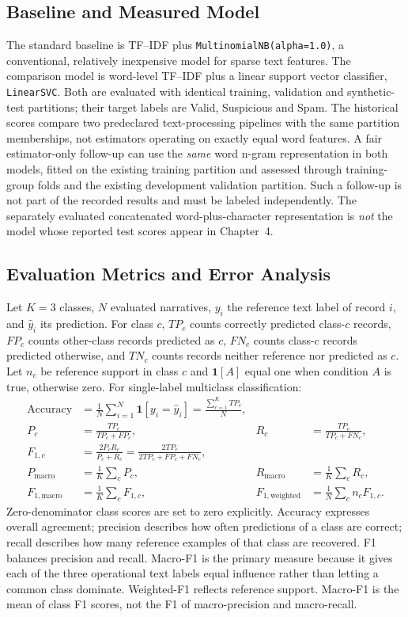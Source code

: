 \subsection{Baseline and Measured Model}
The standard baseline is TF--IDF plus \texttt{MultinomialNB(alpha=1.0)}, a conventional, relatively inexpensive model for sparse text features. The comparison model is word-level TF--IDF plus a linear support vector classifier, \texttt{LinearSVC}. Both are evaluated with identical training, validation and synthetic-test partitions; their target labels are Valid, Suspicious and Spam. The historical scores compare two predeclared text-processing pipelines with the same partition memberships, not estimators operating on exactly equal word features. A fair estimator-only follow-up can use the \emph{same} word n-gram representation in both models, fitted on the existing training partition and assessed through training-group folds and the existing development validation partition. Such a follow-up is not part of the recorded results and must be labeled independently. The separately evaluated concatenated word-plus-character representation is \emph{not} the model whose reported test scores appear in Chapter~4.

\subsection{Evaluation Metrics and Error Analysis}\label{sec:metrics-final}
Let $K=3$ classes, $N$ evaluated narratives, $y_i$ the reference text label of record $i$, and $\hat y_i$ its prediction. For class $c$, $TP_c$ counts correctly predicted class-$c$ records, $FP_c$ counts other-class records predicted as $c$, $FN_c$ counts class-$c$ records predicted otherwise, and $TN_c$ counts records neither reference nor predicted as $c$. Let $n_c$ be reference support in class $c$ and $\mathbf{1}[A]$ equal one when condition $A$ is true, otherwise zero. For single-label multiclass classification:
\begin{align}
\mathrm{Accuracy}&=\frac{1}{N}\sum_{i=1}^{N}\mathbf{1}[y_i=\hat y_i]=\frac{\sum_{c=1}^{K}TP_c}{N},\\
P_c&=\frac{TP_c}{TP_c+FP_c}, & R_c&=\frac{TP_c}{TP_c+FN_c},\\
F_{1,c}&=\frac{2P_cR_c}{P_c+R_c}=\frac{2TP_c}{2TP_c+FP_c+FN_c},\\
P_{\mathrm{macro}}&=\frac{1}{K}\sum_c P_c,&R_{\mathrm{macro}}&=\frac{1}{K}\sum_c R_c,\\
F_{1,\mathrm{macro}}&=\frac{1}{K}\sum_c F_{1,c},&F_{1,\mathrm{weighted}}&=\frac{1}{N}\sum_c n_cF_{1,c}.
\end{align}
Zero-denominator class scores are set to zero explicitly. Accuracy expresses overall agreement; precision describes how often predictions of a class are correct; recall describes how many reference examples of that class are recovered. F1 balances precision and recall. Macro-F1 is the primary measure because it gives each of the three operational text labels equal influence rather than letting a common class dominate. Weighted-F1 reflects reference support. Macro-F1 is the mean of class F1 scores, not the F1 of macro-precision and macro-recall.

